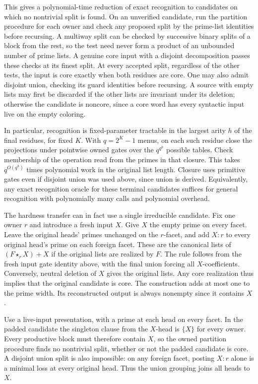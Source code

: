 This gives a polynomial-time reduction of exact
recognition to candidates on which no nontrivial
split is found. On an unverified candidate, run the
partition procedure for each owner and check any
proposed split by the prime-list identities before
recursing. A multiway split can be checked by
successive binary splits of a block from the rest,
so the test need never form a product of an
unbounded number of prime lists. A genuine core
input with a disjoint decomposition passes these
checks at its finest split. At every accepted
split, regardless of the other tests, the input
is core exactly when both residues are core.
One may also admit disjoint union, checking its
guard identities before recursing. A source with
empty lists may first be discarded if the other
lists are invariant under its deletion; otherwise
the candidate is noncore, since a core word has
every syntactic input live on the empty coloring.

In particular, recognition is fixed-parameter
tractable in the largest arity $h$ of the final
residues, for fixed $K$. With $q=2^K-1$ menus,
on each such residue close the projections under
pointwise owned gates over the $q^{q^h}$ possible
tables. Check membership of the operation read
from the primes in that closure. This takes
$q^{O(q^h)}$ times polynomial work in the original
list length. Closure uses primitive gates even if
disjoint union was used above, since union is
derived. Equivalently, any exact recognition
oracle for these terminal candidates suffices for
general recognition with polynomially many calls
and polynomial overhead.

The hardness transfer can in fact use a single
irreducible candidate. Fix one owner $r$ and introduce
a fresh input $X$. Give $X$ the empty prime on every
facet. Leave the original heads' primes unchanged on
the $r$-facet, and add $X:r$ to every original head's
prime on each foreign facet. These are the canonical
lists of $(F\star_r X)+X$ if the original lists are
realized by $F$. The rule follows from the fresh
input gate identity above, with the final union
forcing all $X$-coefficients. Conversely, neutral
deletion of $X$ gives the original lists. Any core
realization thus implies that the original candidate
is core. The construction adds at most one to the
prime width. Its reconstructed output is always
nonempty since it contains $X$.

Use a live-input presentation, with a prime at each
head on every facet. In the padded candidate the
singleton clause from the $X$-head is $\{X\}$ for
every owner. Every productive block must therefore
contain $X$, so the owned partition procedure finds
no nontrivial split, whether or not the padded
candidate is core. A disjoint union split is also
impossible: on any foreign facet, posting $X:r$
alone is a minimal loss at every original head.
Thus the union grouping joins all heads to $X$.

